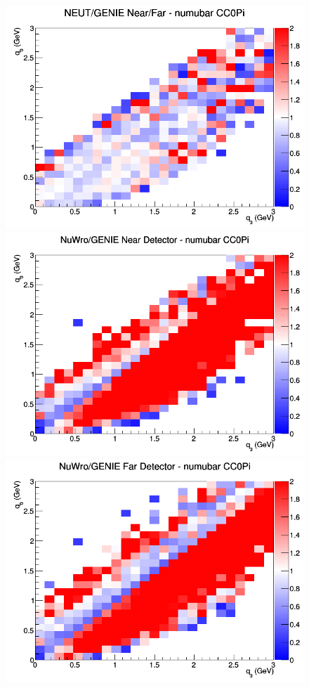 \begin{figure}[h]
\endminipage
{}
\includegraphics[width=\linewidth]{eff_q0_q3/GAr/ratios/CC0Pi_NEUT_GENIE_numubar_NF_q3_q0.png}
\endminipage
\newline
{}
\includegraphics[width=\linewidth]{eff_q0_q3/GAr/ratios/CC0Pi_NuWro_GENIE_numubar_near_q3_q0.png}
\endminipage
{}
\includegraphics[width=\linewidth]{eff_q0_q3/GAr/ratios/CC0Pi_NuWro_GENIE_numubar_far_q3_q0.png}

\end{figure}
